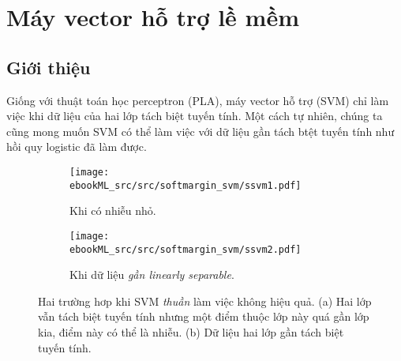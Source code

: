 \chapter{Máy vector hỗ trợ lề mềm}


\section{Giới thiệu}
Giống với thuật toán học perceptron (PLA), máy vector hỗ trợ (SVM) chỉ làm việc khi dữ liệu của hai lớp tách biệt tuyến tính. Một cách tự nhiên, chúng ta cũng mong muốn SVM có thể làm việc với dữ liệu gần tách btệt tuyến tính như hồi quy logistic đã làm được.









\begin{figure}[t]
\begin{subfigure}{0.46\textwidth}
\texttt{[image: ebookML\_src/src/softmargin\_svm/ssvm1.pdf]}
\caption{Khi có nhiễu nhỏ.}
\label{fig:20_1a}
\end{subfigure}
\begin{subfigure}{0.48\textwidth}
\texttt{[image: ebookML\_src/src/softmargin\_svm/ssvm2.pdf]}
\caption{Khi dữ liệu \textit{gần linearly separable}.}
\label{fig:20_1b}
\end{subfigure}
\caption{Hai trường hơp khi SVM \textit{thuần} làm việc không hiệu quả. (a) Hai lớp vẫn tách biệt tuyến tính nhưng một điểm thuộc lớp này quá gần lớp kia, điểm này có thể là nhiễu. (b) Dữ liệu hai lớp gần tách biệt tuyến tính.}
\label{fig:20_1}
\end{figure}


